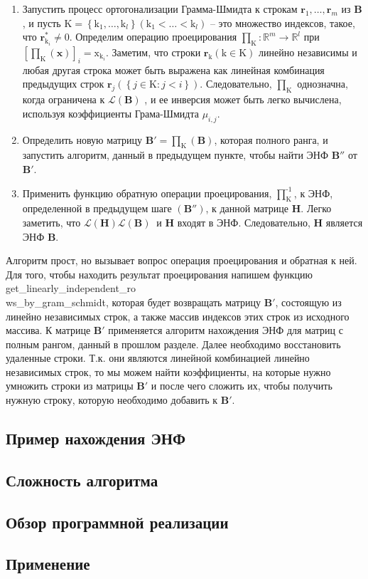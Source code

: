 \begin{enumerate}
\item Запустить процесс ортогонализации Грамма-Шмидта к строкам $ \mathbf{r}_1, \ldots, \mathbf{r}_m $ из $ \mathbf{B} $, и пусть $ \mathrm{K}=\left\{\mathrm{k}_1, \ldots, \mathrm{k}_l \right\}(\mathrm{k}_1< \ldots <\mathrm{k}_l) $ – это множество индексов, такое, что $ \mathbf{r}_{\mathrm{k}_i}^\ast \neq 0 $. Определим операцию проецирования $ \prod_\mathrm{K}:\mathbb{R}^m \rightarrow \mathbb{R}^l $ при $ [\prod_\mathrm{K}(\mathbf{x})]_i = \mathrm{x}_{\mathrm{k}_i} $. Заметим, что строки $ \mathbf{r}_\mathrm{k}(\mathrm{k} \in \mathrm{K}) $ линейно независимы и любая другая строка может быть выражена как линейная комбинация предыдущих строк $ \mathbf{r}_j\left(\left\{j \in \mathrm{K}:j<i \right\}\right) $. Следовательно, $ \prod_\mathrm{K} $ однозначна, когда ограничена к $ \mathcal{L}(\mathbf{B})$ , и ее инверсия может быть легко вычислена, используя коэффициенты Грама-Шмидта $ \mu_{i,j} $.
\item Определить новую матрицу $ \mathbf{B}'=\prod_\mathrm{K}(\mathbf{B}) $, которая полного ранга, и запустить алгоритм, данный в предыдущем пункте, чтобы найти ЭНФ $ \mathbf{B}'' $ от $ \mathbf{B}' $.
\item Применить функцию обратную операции проецирования, $ \prod_\mathrm{K}^{\text{-}1} $, к ЭНФ, определенной в предыдущем шаге $ (\mathbf{B}'') $, к данной матрице $ \mathbf{H} $. Легко заметить, что $ \mathcal{L}\left(\mathbf{H}\right)\mathcal{L}\left(\mathbf{B}\right)\ $ и $ \mathbf{H} $ входят в ЭНФ. Следовательно, $ \mathbf{H} $ является ЭНФ $ \mathbf{B} $.
\end{enumerate}

Алгоритм прост, но вызывает вопрос операция проецирования и обратная к ней. Для того, чтобы находить результат проецирования напишем функцию get\_linearly\_independent\_ro\\ws\_by\_gram\_schmidt, которая будет возвращать матрицу $ \mathbf{B}' $, состоящую из линейно независимых строк, а также массив индексов этих строк из исходного массива. К матрице $ \mathbf{B}' $ применяется алгоритм нахождения ЭНФ для матриц с полным рангом, данный в прошлом разделе. Далее необходимо восстановить удаленные строки. Т.к. они являются линейной комбинацией линейно независимых строк, то мы можем найти коэффициенты, на которые нужно умножить строки из матрицы $ \mathbf{B}' $ и после чего сложить их, чтобы получить нужную строку, которую необходимо добавить к $ \mathbf{B}' $.

\subsection{Пример нахождения ЭНФ}

\subsection{Сложность алгоритма}

\subsection{Обзор программной реализации}

\subsection{Применение}

\clearpage